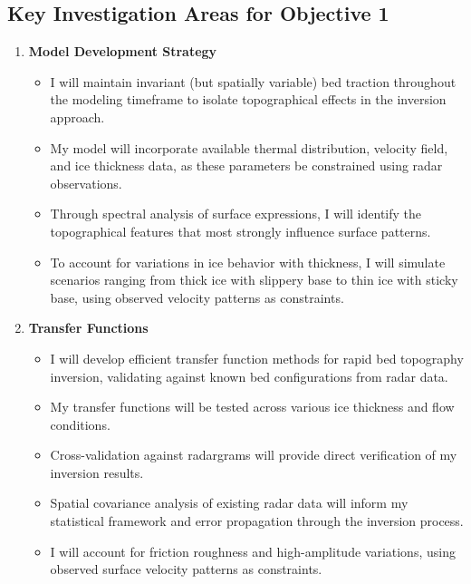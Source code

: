 \subsection*{Key Investigation Areas for Objective 1}
\begin{enumerate}
\item\textbf{Model Development Strategy}
    \begin{itemize}
    \item I will maintain invariant (but spatially variable) bed traction throughout the modeling timeframe to isolate topographical effects in the inversion approach.
    
    \item My model will incorporate available thermal distribution, velocity field, and ice thickness data, as these parameters be constrained using radar observations.
    
    \item Through spectral analysis of surface expressions, I will identify the topographical features that most strongly influence surface patterns.
    
    \item To account for variations in ice behavior with thickness, I will simulate scenarios ranging from thick ice with slippery base to thin ice with sticky base, using observed velocity patterns as constraints.
    \end{itemize}

\item\textbf{Transfer Functions}
    \begin{itemize}
    \item I will develop efficient transfer function methods for rapid bed topography inversion, validating against known bed configurations from radar data.
    
    \item My transfer functions will be tested across various ice thickness and flow conditions.
    
    \item Cross-validation against radargrams will provide direct verification of my inversion results.
    
    \item Spatial covariance analysis of existing radar data will inform my statistical framework and error propagation through the inversion process.
    
    \item I will account for friction roughness and high-amplitude variations, using observed surface velocity patterns as constraints.
    \end{itemize}


\end{enumerate}
